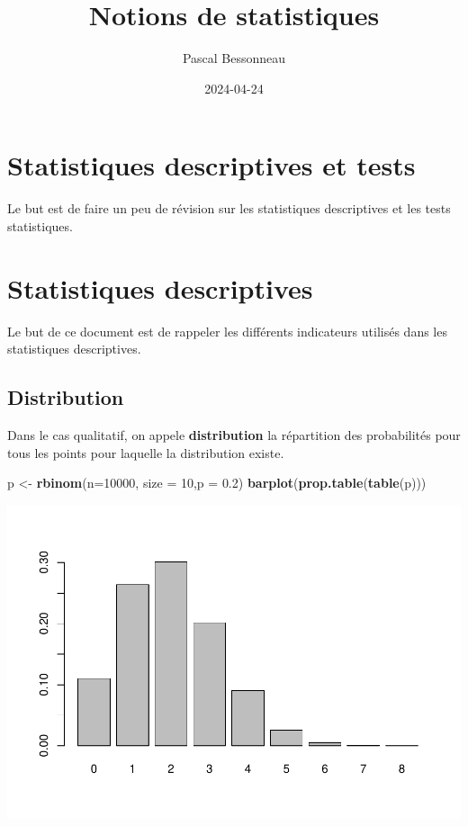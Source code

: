 \documentclass[
]{book}
\title{Notions de statistiques}
\author{Pascal Bessonneau}
\date{2024-04-24}
\newenvironment{Shaded}{\begin{snugshade}}{\end{snugshade}}
\newcommand{\AttributeTok}[1]{\textcolor[rgb]{0.13,0.29,0.53}{#1}}
\newcommand{\DecValTok}[1]{\textcolor[rgb]{0.00,0.00,0.81}{#1}}
\newcommand{\FloatTok}[1]{\textcolor[rgb]{0.00,0.00,0.81}{#1}}
\newcommand{\FunctionTok}[1]{\textcolor[rgb]{0.13,0.29,0.53}{\textbf{#1}}}
\newcommand{\NormalTok}[1]{#1}
\newcommand{\OtherTok}[1]{\textcolor[rgb]{0.56,0.35,0.01}{#1}}
\begin{document}
\maketitle

{
\setcounter{tocdepth}{1}
\tableofcontents
}
\hypertarget{statistiques-descriptives-et-tests}{%
\chapter{Statistiques descriptives et tests}\label{statistiques-descriptives-et-tests}}

Le but est de faire un peu de révision sur les statistiques descriptives et
les tests statistiques.

\hypertarget{statistiques-descriptives}{%
\chapter{Statistiques descriptives}\label{statistiques-descriptives}}

Le but de ce document est de rappeler les différents indicateurs utilisés dans
les statistiques descriptives.

\hypertarget{distribution}{%
\section{Distribution}\label{distribution}}

Dans le cas qualitatif, on appele \textbf{distribution} la répartition des
probabilités pour tous les points pour laquelle la distribution existe.

\begin{Shaded}
\begin{Highlighting}[]
\NormalTok{p }\OtherTok{\textless{}{-}} \FunctionTok{rbinom}\NormalTok{(}\AttributeTok{n=}\DecValTok{10000}\NormalTok{, }\AttributeTok{size =} \DecValTok{10}\NormalTok{,}\AttributeTok{p =} \FloatTok{0.2}\NormalTok{)}
\FunctionTok{barplot}\NormalTok{(}\FunctionTok{prop.table}\NormalTok{(}\FunctionTok{table}\NormalTok{(p)))}
\end{Highlighting}
\end{Shaded}

\includegraphics{_main_files/figure-latex/unnamed-chunk-2-1.pdf}
\end{document}
